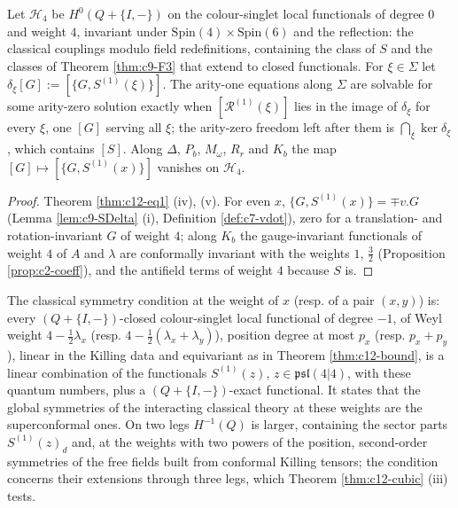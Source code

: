 \begin{proposition}
\label{prop:c12-couplings}
Let $\mathcal H_4$ be $H^0(Q+\{I,-\})$ on the colour-singlet local functionals of degree $0$ and weight $4$, invariant under $\mathrm{Spin}(4)\times\mathrm{Spin}(6)$ and the reflection: the classical couplings modulo field redefinitions, containing the class of $S$ and the classes of Theorem \ref{thm:c9-F3} that extend to closed functionals. For $\xi\in\Sigma$ let $\delta_\xi[G]:=[\{G,S^{(1)}(\xi)\}]$. The arity-one equations along $\Sigma$ are solvable for some arity-zero solution exactly when $[\mathcal R^{(1)}(\xi)]$ lies in the image of $\delta_\xi$ for every $\xi$, one $[G]$ serving all $\xi$; the arity-zero freedom left after them is $\bigcap_\xi\ker\delta_\xi$, which contains $[S]$. Along $\Delta$, $P_b$, $M_\omega$, $R_r$ and $K_b$ the map $[G]\mapsto[\{G,S^{(1)}(x)\}]$ vanishes on $\mathcal H_4$.
\end{proposition}

\begin{proof}
Theorem \ref{thm:c12-eq1} (iv), (v). For even $x$, $\{G,S^{(1)}(x)\}=\mp v.G$ (Lemma \ref{lem:c9-SDelta} (i), Definition \ref{def:c7-vdot}), zero for a translation- and rotation-invariant $G$ of weight $4$; along $K_b$ the gauge-invariant functionals of weight $4$ of $A$ and $\lambda$ are conformally invariant with the weights $1$, $\tfrac32$ (Proposition \ref{prop:c2-coeff}), and the antifield terms of weight $4$ because $S$ is.
\end{proof}

\begin{definition}
\label{def:c12-cs}
The classical symmetry condition at the weight of $x$ (resp. of a pair $(x,y)$) is: every $(Q+\{I,-\})$-closed colour-singlet local functional of degree $-1$, of Weyl weight $4-\tfrac12\lambda_x$ (resp. $4-\tfrac12(\lambda_x+\lambda_y)$), position degree at most $p_x$ (resp. $p_x+p_y$), linear in the Killing data and equivariant as in Theorem \ref{thm:c12-bound}, is a linear combination of the functionals $S^{(1)}(z)$, $z\in\mathfrak{psl}(4|4)$, with these quantum numbers, plus a $(Q+\{I,-\})$-exact functional. It states that the global symmetries of the interacting classical theory at these weights are the superconformal ones. On two legs $H^{-1}(Q)$ is larger, containing the sector parts $S^{(1)}(z)_d$ and, at the weights with two powers of the position, second-order symmetries of the free fields built from conformal Killing tensors; the condition concerns their extensions through three legs, which Theorem \ref{thm:c12-cubic} (iii) tests.
\end{definition}

